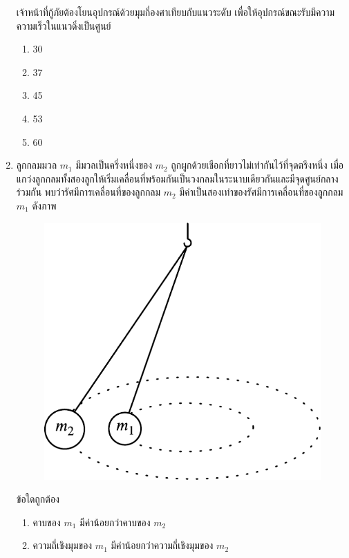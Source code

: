 \documentclass[a4paper, 12pt]{article}
\begin{document}
\begin{enumerate}
\begin{figure}[H]
          \end{figure}
          เจ้าหน้าที่กู้ภัยต้องโยนอุปกรณ์ด้วยมุมกี่องศาเทียบกับแนวระดับ เพื่อให้อุปกรณ์ขณะรับมีความความเร็วในแนวดิ่งเป็นศูนย์
          \begin{enumerate}
              \item 30
              \item 37
              \item 45
              \item 53
              \item 60
          \end{enumerate}
          \newpage
    \item ลูกกลมมวล \(m_1\) มีมวลเป็นครึ่งหนึ่งของ \(m_2\) ถูกผูกด้วยเชือกที่ยาวไม่เท่ากันไว้ที่จุดตรึงหนึ่ง เมื่อแกว่งลูกกลมทั้งสองลูกให้เริ่มเคลื่อนที่พร้อมกันเป็นวงกลมในระนาบเดียวกันและมีจุดศูนย์กลางร่วมกัน พบว่ารัศมีการเคลื่อนที่ของลูกกลม \(m_2\) มีค่าเป็นสองเท่าของรัศมีการเคลื่อนที่ของลูกกลม \(m_1\) ดังภาพ \\
          \begin{figure}[H]
              \centering
              \includegraphics[scale = 0.8]{images/3_3.pdf}
          \end{figure}
          ข้อใดถูกต้อง
          \begin{enumerate}
              \item คาบของ \(m_1\) มีค่าน้อยกว่าคาบของ \(m_2\)
              \item ความถี่เชิงมุมของ \(m_1\) มีค่าน้อยกว่าความถี่เชิงมุมของ \(m_2\)

\end{enumerate}
\end{enumerate}
\end{document}
